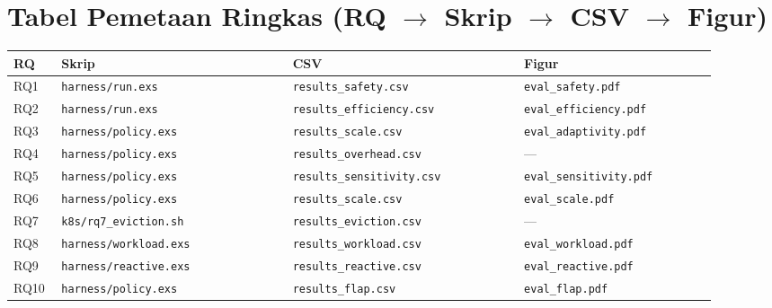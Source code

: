\documentclass[11pt]{article}
\newcommand{\code}[1]{\texttt{\small #1}}
\begin{document}
\section{Tabel Pemetaan Ringkas (RQ $\rightarrow$ Skrip $\rightarrow$ CSV $\rightarrow$ Figur)}
\label{sec:peta}
\begin{longtable}{@{}p{0.06\linewidth} p{0.30\linewidth} p{0.30\linewidth} p{0.25\linewidth}@{}}
\toprule
\textbf{RQ} & \textbf{Skrip} & \textbf{CSV} & \textbf{Figur} \\
\midrule \endhead
RQ1 & \code{harness/run.exs} & \code{results\_safety.csv} & \code{eval\_safety.pdf} \\
RQ2 & \code{harness/run.exs} & \code{results\_efficiency.csv} & \code{eval\_efficiency.pdf} \\
RQ3 & \code{harness/policy.exs} & \code{results\_scale.csv} & \code{eval\_adaptivity.pdf} \\
RQ4 & \code{harness/policy.exs} & \code{results\_overhead.csv} & --- \\
RQ5 & \code{harness/policy.exs} & \code{results\_sensitivity.csv} & \code{eval\_sensitivity.pdf} \\
RQ6 & \code{harness/policy.exs} & \code{results\_scale.csv} & \code{eval\_scale.pdf} \\
RQ7 & \code{k8s/rq7\_eviction.sh} & \code{results\_eviction.csv} & --- \\
RQ8 & \code{harness/workload.exs} & \code{results\_workload.csv} & \code{eval\_workload.pdf} \\
RQ9 & \code{harness/reactive.exs} & \code{results\_reactive.csv} & \code{eval\_reactive.pdf} \\
RQ10 & \code{harness/policy.exs} & \code{results\_flap.csv} & \code{eval\_flap.pdf} \\
\bottomrule
\end{longtable}

\end{document}
